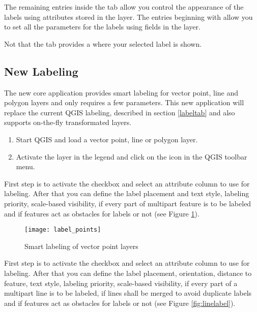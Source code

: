 The remaining entries inside the  tab allow you control the appearance of the
labels using attributes stored in the layer. The entries beginning with  allow you to
set all the parameters for the labels using fields in the layer.

Not that the  tab provides a  where your
selected label is shown.

\subsection{New Labeling}\label{newlabel}

The new  core application provides smart labeling
for vector point,  line and polygon layers and only requires a few parameters.
This new application will replace the current QGIS labeling, described in section
\ref{labeltab} and also supports on-the-fly transformated layers.


\begin{enumerate}
  \item Start QGIS and load a vector point, line or polygon layer.
  \item Activate the layer in the legend and click on the
   icon in the QGIS toolbar menu.
\end{enumerate}


First step is to activate the  checkbox and select an attribute
column to use for labeling. After that you can define the label placement and text style,
labeling priority, scale-based visibility, if every part of multipart feature is to be
labeled and if features act as obstacles for labels or not (see
Figure \ref{fig:pointlabel}).

\begin{figure}[ht]
\centering
   \texttt{[image: label\_points]}
   \caption{Smart labeling of vector point layers \nixcaption}\label{fig:pointlabel}
\end{figure}


First step is to activate the  checkbox and select an attribute
column to use for labeling. After that you can define the label placement, orientation,
distance to feature, text style, labeling priority, scale-based visibility, if every part
of a multipart line is to be labeled, if lines shall be merged to avoid duplicate labels
and if features act as obstacles for labels or not (see Figure \ref{fig:linelabel}).

